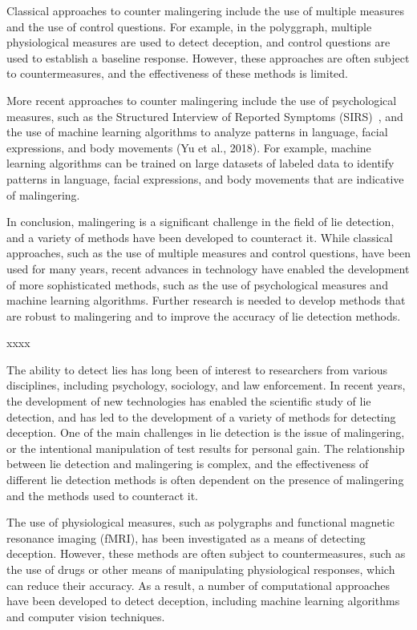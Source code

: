 \documentclass[onecolumn, compsoc,10pt]{IEEEtran}
\begin{document}
Classical approaches to counter malingering include the use of multiple measures and the use of control questions. For example, in the polyggraph, multiple physiological measures are used to detect deception, and control questions are used to establish a baseline response. However, these approaches are often subject to countermeasures, and the effectiveness of these methods is limited.

More recent approaches to counter malingering include the use of psychological measures, such as the Structured Interview of Reported Symptoms (SIRS)~\cite{Wong2005}, and the use of machine learning algorithms to analyze patterns in language, facial expressions, and body movements (Yu et al., 2018). For example, machine learning algorithms can be trained on large datasets of labeled data to identify patterns in language, facial expressions, and body movements that are indicative of malingering.

In conclusion, malingering is a significant challenge in the field of lie detection, and a variety of methods have been developed to counteract it. While classical approaches, such as the use of multiple measures and control questions, have been used for many years, recent advances in technology have enabled the development of more sophisticated methods, such as the use of psychological measures and machine learning algorithms. Further research is needed to develop methods that are robust to malingering and to improve the accuracy of lie detection methods.

xxxx

The ability to detect lies has long been of interest to researchers from various disciplines, including psychology, sociology, and law enforcement. In recent years, the development of new technologies has enabled the scientific study of lie detection, and has led to the development of a variety of methods for detecting deception. One of the main challenges in lie detection is the issue of malingering, or the intentional manipulation of test results for personal gain. The relationship between lie detection and malingering is complex, and the effectiveness of different lie detection methods is often dependent on the presence of malingering and the methods used to counteract it.

The use of physiological measures, such as polygraphs and functional magnetic resonance imaging (fMRI), has been investigated as a means of detecting deception. However, these methods are often subject to countermeasures, such as the use of drugs or other means of manipulating physiological responses, which can reduce their accuracy. As a result, a number of computational approaches have been developed to detect deception, including machine learning algorithms and computer vision techniques.
\end{document}
